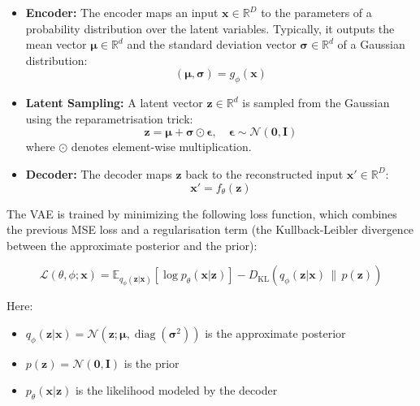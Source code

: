 \documentclass{article}
\begin{document}
\begin{itemize}
  \item \textbf{Encoder:} The encoder maps an input \( \mathbf{x} \in \mathbb{R}^D \) to the parameters of a probability distribution over the latent variables. Typically, it outputs the mean vector \( \boldsymbol{\mu} \in \mathbb{R}^d \) and the standard deviation vector \( \boldsymbol{\sigma} \in \mathbb{R}^d \) of a Gaussian distribution:
  \begin{equation}
  (\boldsymbol{\mu}, \boldsymbol{\sigma}) = g_{\phi}(\mathbf{x})
  \end{equation}
  
  \item \textbf{Latent Sampling:} A latent vector \( \mathbf{z} \in \mathbb{R}^d \) is sampled from the Gaussian using the reparametrisation trick:
  \begin{equation}
  \mathbf{z} = \boldsymbol{\mu} + \boldsymbol{\sigma} \odot \boldsymbol{\epsilon}, \quad \boldsymbol{\epsilon} \sim \mathcal{N}(\mathbf{0}, \mathbf{I})
  \end{equation}
  where \( \odot \) denotes element-wise multiplication.
  
  \item \textbf{Decoder:} The decoder maps \( \mathbf{z} \) back to the reconstructed input \( \mathbf{x}' \in \mathbb{R}^D \):
  \begin{equation}
  \mathbf{x}' = f_{\theta}(\mathbf{z})
  \end{equation}
\end{itemize}

The VAE is trained by minimizing the following loss function, which combines the previous MSE loss and a regularisation term (the Kullback-Leibler divergence between the approximate posterior and the prior):

\begin{equation}\label{VAE loss function}
\mathcal{L}(\theta, \phi; \mathbf{x}) = \mathbb{E}_{q_{\phi}(\mathbf{z}|\mathbf{x})} \left[ \log p_{\theta}(\mathbf{x}|\mathbf{z}) \right] - D_{\text{KL}} \left( q_{\phi}(\mathbf{z}|\mathbf{x}) \, \| \, p(\mathbf{z}) \right)
\end{equation}

Here:
\begin{itemize}
  \item \( q_{\phi}(\mathbf{z}|\mathbf{x}) = \mathcal{N}(\mathbf{z}; \boldsymbol{\mu}, \operatorname{diag}(\boldsymbol{\sigma}^2)) \) is the approximate posterior
  \item \( p(\mathbf{z}) = \mathcal{N}(\mathbf{0}, \mathbf{I}) \) is the prior
  \item \( p_{\theta}(\mathbf{x}|\mathbf{z}) \) is the likelihood modeled by the decoder
\end{itemize}
\end{document}
